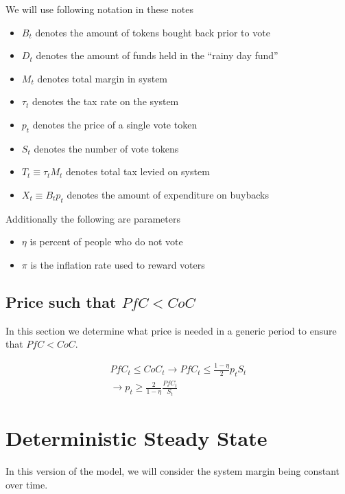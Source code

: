 \documentclass[12pt]{article}
\begin{document}
  We will use following notation in these notes

  \begin{itemize}
    \item $B_t$ denotes the amount of tokens bought back prior to vote
    \item $D_t$ denotes the amount of funds held in the ``rainy day fund''
    \item $M_t$ denotes total margin in system
    \item $\tau_t$ denotes the tax rate on the system
    \item $p_t$ denotes the price of a single vote token
    \item $S_t$ denotes the number of vote tokens
    \item $T_t \equiv \tau_t M_t$ denotes total tax levied on system
    \item $X_t \equiv B_t p_t$ denotes the amount of expenditure on buybacks
  \end{itemize}

  Additionally the following are parameters

  \begin{itemize}
    \item $\eta$ is percent of people who do not vote
    \item $\pi$ is the inflation rate used to reward voters
  \end{itemize}

  \subsection{Price such that $PfC < CoC$}

    In this section we determine what price is needed in a generic period to ensure that
    $PfC < CoC$.

    \begin{align*}
      PfC_t \leq CoC_t \rightarrow PfC_t \leq \frac{1 - \eta}{2} p_t S_t \\
      \rightarrow p_t \geq \frac{2}{1 - \eta} \frac{PfC_t}{S_t}
    \end{align*}


\section{Deterministic Steady State} \label{sec:dss}

  In this version of the model, we will consider the system margin being constant over time.
\end{document}
